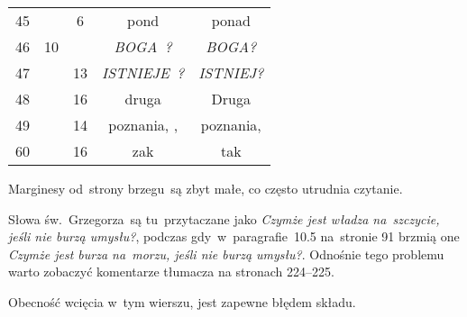 \documentclass[a4paper,11pt]{article}
\begin{document}
\begin{center}
\begin{tabular}{|c|c|c|c|c|}
    45  & &  6 & pond & ponad \\
    46  & 10 & & \textit{BOGA~?} & \textit{BOGA?} \\
    47  & & 13 & \textit{ISTNIEJE~?} & \textit{ISTNIEJ?} \\
    48  & & 16 & druga & Druga \\
    49  & & 14 & poznania,{ }, & poznania, \\
    60  & & 16 & zak & tak \\
    \hline
  \end{tabular}

\end{center}

\vspace{\spaceTwo}










\newpage
{}




\start Marginesy od~strony brzegu~są zbyt małe, co często utrudnia
czytanie.








\start {} Słowa św.~Grzegorza~są tu~przytaczane jako
\textit{Czymże jest władza na~szczycie, jeśli nie burzą umysłu?},
podczas gdy~w~paragrafie~10.5 na~stronie 91 brzmią one \textit{Czymże
  jest burza na~morzu, jeśli nie burzą umysłu?}. Odnośnie tego
problemu warto zobaczyć komentarze tłumacza na stronach 224--225.

\vspace{\spaceFour}



\start {} Obecność wcięcia w~tym wierszu, jest zapewne
błędem składu.
\end{document}
